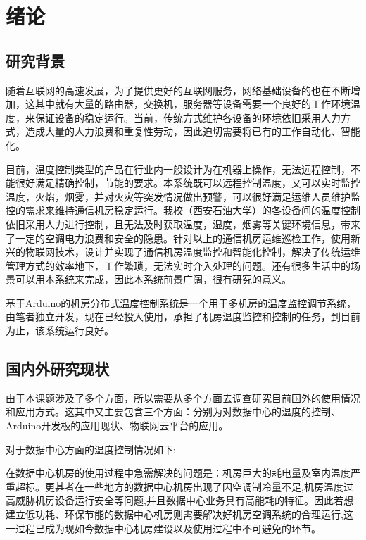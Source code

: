 \section{绪论}

\subsection{研究背景}

随着互联网的高速发展，为了提供更好的互联网服务，网络基础设备的也在不断增加，这其中就有大量的路由器，交换机，服务器等设备需要一个良好的工作环境温度，来保证设备的稳定运行。当前，传统方式维护各设备的环境依旧采用人力方式，造成大量的人力浪费和重复性劳动，因此迫切需要将已有的工作自动化、智能化。

目前，温度控制类型的产品在行业内一般设计为在机器上操作，无法远程控制，不能很好满足精确控制，节能的要求。本系统既可以远程控制温度，又可以实时监控温度，火焰，烟雾，并对火灾等突发情况做出预警，可以很好满足运维人员维护监控的需求来维持通信机房稳定运行。我校（西安石油大学）的各设备间的温度控制依旧采用人力进行控制，且无法及时获取温度，湿度，烟雾等关键环境信息，带来了一定的空调电力浪费和安全的隐患。针对以上的通信机房运维巡检工作，使用新兴的物联网技术，设计并实现了通信机房温度监控和智能化控制，解决了传统运维管理方式的效率地下，工作繁琐，无法实时介入处理的问题。还有很多生活中的场景可以用本系统来完成，因此本系统前景广阔，很有研究的意义。

基于Arduino的机房分布式温度控制系统是一个用于多机房的温度监控调节系统，由笔者独立开发，现在已经投入使用，承担了机房温度监控和控制的任务，到目前为止，该系统运行良好。

\subsection{国内外研究现状}

由于本课题涉及了多个方面，所以需要从多个方面去调查研究目前国外的使用情况和应用方式。这其中又主要包含三个方面：分别为对数据中心的温度的控制、Arduino开发板的应用现状、物联网云平台的应用。

对于数据中心方面的温度控制情况如下:

在数据中心机房的使用过程中急需解决的问题是：机房巨大的耗电量及室内温度严重超标。更甚者在一些地方的数据中心机房出现了因空调制冷量不足,机房温度过高威胁机房设备运行安全等问题,并且数据中心业务具有高能耗的特征。因此若想建立低功耗、环保节能的数据中心机房则需要解决好机房空调系统的合理运行,这一过程已成为现如今数据中心机房建设以及使用过程中不可避免的环节。

